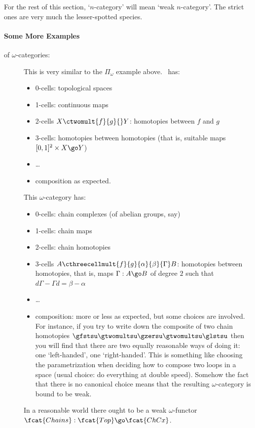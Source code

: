 For the rest of this section, `$n$-category' will mean `weak $n$-category'.
The strict ones are very much the lesser-spotted species.%
%
%

\paragraph*{Some More Examples} of $\omega$-categories:
%
\begin{description}
%
\item[\Top]%
% 
%
This is very similar to the $\Pi_\omega$ example above.  \Top\
has:
\begin{itemize}
\item 0-cells: topological spaces
\item 1-cells: continuous maps
\item 2-cells $X \ctwomult{f}{g}{} Y$: homotopies
between $f$ and $g$
\item 3-cells: homotopies between homotopies (that is, suitable maps
$[0,1]^2 \times X \go Y$)
\item \ldots
\item composition as expected.
\end{itemize}

\item[]
This $\omega$-category has:
\begin{itemize}
\item 0-cells: chain complexes%
%
%
(of abelian groups, say)
\item 1-cells: chain maps
\item 2-cells: chain homotopies%
%
%
\item 3-cells $A\cthreecellmult{f}{g}{\alpha}{\beta}{\Gamma}B$: homotopies
between homotopies,%
% 
%
that is, maps $\Gamma: A \go B$ of degree $2$ such that
$d\Gamma - \Gamma d = \beta - \alpha$
\item \ldots
\item composition: more or less as expected, but some choices are involved.
For instance, if you try to write down the composite of two chain
homotopies $\gfstsu\gtwomultsu\gzersu\gtwomultsu\glstsu$ then you will find
that there are two equally reasonable ways of doing it: one `left-handed',%
%
%
one `right-handed'.  This is something like choosing the parametrization
when deciding how to compose two loops in a space (usual choice: do
everything at double speed).  Somehow the fact that there is no canonical
choice means that the resulting $\omega$-category is bound to be weak.
\end{itemize}
%
In a reasonable world there ought to be a weak $\omega$-functor
$\fcat{Chains}: \fcat{Top} \go \fcat{ChCx}$.


\end{description}
